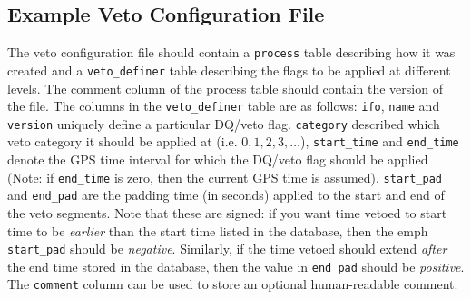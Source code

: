 {\subsection{Example Veto Configuration File}

The veto configuration file should contain a \verb|process| table
describing how it was created and a \verb|veto_definer| table
describing the flags to be applied at different levels. The comment
column of the process table should contain the version of the file.
The columns in the \verb|veto_definer| table are as follows:
\verb|ifo|, \verb|name| and \verb|version| uniquely define a
particular DQ/veto flag. \verb|category| described which veto category
it should be applied at (i.e. $0, 1, 2, 3, \ldots$), \verb|start_time|
and \verb|end_time| denote the GPS time interval for which the DQ/veto
flag should be applied (Note: if \verb|end_time| is zero, then the
current GPS time is assumed). \verb|start_pad| and \verb|end_pad| are
the padding time (in seconds) applied to the start and end of the veto
segments. Note that these are signed: if you want time vetoed to start
time to be \emph{earlier} than the start time listed in the database,
then the emph \verb|start_pad| should be \emph{negative}. Similarly,
if the time vetoed should extend \emph{after} the end time stored in
the database, then the value in \verb|end_pad| should be
\emph{positive}. The \verb|comment| column can be used to store an
optional human-readable comment.

}
